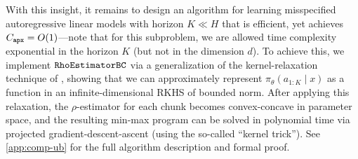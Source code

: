 With this insight, it remains to design an algorithm for learning misspecified autoregressive linear models with horizon $K \ll H$ that is efficient, yet achieves $C_{\texttt{apx}}=O(1)$---note that for this subproblem, we are allowed time complexity exponential in the horizon $K$ (but not in the dimension $d$). To achieve this, we implement $\texttt{RhoEstimatorBC}$ via a generalization of the kernel-relaxation technique of \citet{shalev2011learning}, showing that we can approximately represent $\pi_{\theta}(a_{1:K}\mid{}x)$ as a function in an infinite-dimensional RKHS of bounded norm. %
After applying this relaxation, the $\rho$-estimator for each chunk becomes convex-concave in parameter space, and the resulting min-max program can be solved in polynomial time via projected gradient-descent-ascent (using the so-called ``kernel trick''). See \cref{app:comp-ub} for the full algorithm description and formal proof.\loose

